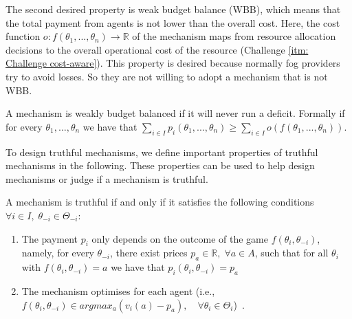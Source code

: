 \documentclass[11pt]{phdthesis}
\begin{document}

The second desired property is weak budget balance (WBB), which means that the total payment from agents is not lower than the overall cost. Here, the cost function $ o: f(\theta_1,...,\theta_n) \rightarrow \mathbb{R} $ of the mechanism maps from resource allocation decisions to the overall operational cost of the resource (Challenge \ref{itm: Challenge cost-aware}). This property is desired because normally fog providers try to avoid losses. So they are not willing to adopt a mechanism that is not WBB. 

\begin{definition}
	A mechanism is weakly budget balanced if it will never run a deficit. Formally if for every $ \theta_1,\ldots, \theta_n $ we have that $ \sum_{i \in I} p_i(\theta_1,...,\theta_n) \geq \sum_{i \in I} o(f(\theta_1,...,\theta_n)) $. 
\end{definition}


To design truthful mechanisms, we define important properties of truthful mechanisms in the following. These properties can be used to help design mechanisms or judge if a mechanism is truthful. 
\begin{proposition}
	A mechanism is truthful if and only if it satisfies the following conditions $\forall i \in I,\; \theta_{-i} \in \Theta_{-i}$:
	\begin{enumerate}
		\item The payment $p_i$ only depends on the outcome of the game $f(\theta_i, \theta_{-i})$, namely, for every $\theta_{-i}$, there exist prices $p_a \in \mathbb{R}, \; \forall a \in A$, such that for all $\theta_i$ with $f(\theta_i, \theta_{-i})=a$ we have that $p_i(\theta_i,\theta_{-i}) = p_a$
		\item The mechanism optimises for each agent (i.e., $f(\theta_i, \theta_{-i}) \in argmax_a(v_i(a) - p_a), \quad \forall \theta_i \in \Theta_{i}$)~\citep[Proposition 9.27]{nisan2007algorithmic}. 
	\end{enumerate}
\end{proposition}
\end{document}
